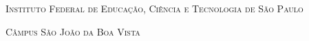 \begin{titlingpage}
    
    
    \center
    
    \noindent
    \chaptitlefont\large\textsc{Instituto Federal de Educação, Ciência e Tecnologia de São Paulo}
    \vspace{0.5cm}

    \noindent    
    \chaptitlefont\large\textsc{Câmpus São João da Boa Vista}
    \vspace{3.5cm}
    
    \noindent
    \chaptitlefont\Large\textsc{\theauthor}
    \vspace{3.5cm}
    
    \noindent
    \chaptitlefont\HUGE\textsc{\thetitle}
    \vspace*{\fill}

    \noindent
    \large\textsc{\thedate}
    
    \restoregeometry
    
\end{titlingpage}

